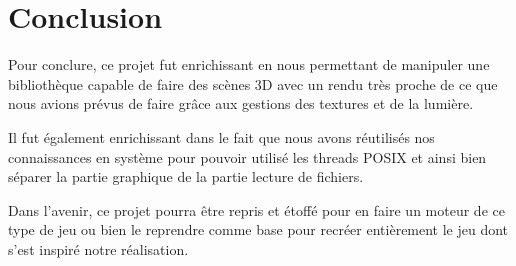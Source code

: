 \section*{Conclusion}

	Pour conclure, ce projet fut enrichissant en nous permettant de manipuler une bibliothèque capable de faire des scènes 3D avec un rendu très proche de ce que nous avions prévus de faire grâce aux gestions des textures et de la lumière.\newline 
	
	Il fut également enrichissant dans le fait que nous avons réutilisés nos connaissances en système pour pouvoir utilisé les threads POSIX et ainsi bien séparer la partie graphique de la partie lecture de fichiers.\newline
	
	Dans l'avenir, ce projet pourra être repris et étoffé pour en faire un moteur de ce type de jeu ou bien le reprendre comme base pour recréer entièrement le jeu dont s'est inspiré notre réalisation.

